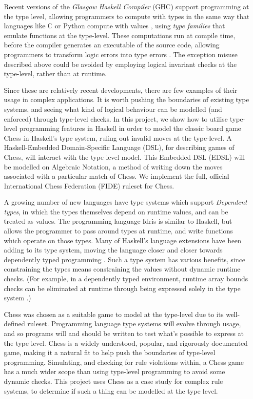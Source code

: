 \documentclass[12pt, a4paper, bibliography=totocnumbered]{scrreprt}
\begin{document}
Recent versions of the \emph{Glasgow Haskell Compiler} (GHC) support programming at the type level, allowing programmers to compute with types in the same way that languages like C or Python compute with values \cite{yorgey2012giving}, using \emph{type families} \cite{opentfs} \cite{closedtfs} that emulate functions at the type-level. These computations run at compile time, before the compiler generates an executable of the source code, allowing programmers to transform logic errors into type errors \cite{twt}. The exception misuse described above could be avoided by employing logical invariant checks at the type-level, rather than at runtime.

Since these are relatively recent developments, there are few examples of their usage in complex applications. It is worth pushing the boundaries of existing type systems, and seeing what kind of logical behaviour can be modelled (and enforced) through type-level checks. In this project, we show how to utilise type-level programming features in Haskell in order to model the classic board game Chess in Haskell's type system, ruling out invalid moves at the type-level. A Haskell-Embedded Domain-Specific Language (DSL), for describing games of Chess, will interact with the type-level model. This Embedded DSL (EDSL) will be modelled on Algebraic Notation, a method of writing down the moves associated with a particular match of Chess. We implement the full, official International Chess Federation (FIDE) ruleset for Chess.

A growing number of new languages have type systems which support \emph{Dependent types}, in which the types themselves depend on runtime values, and can be treated as values. The programming language Idris is similar to Haskell, but allows the programmer to pass around types at runtime, and write functions which operate on those types. Many of Haskell's language extensions have been adding to its type system, moving the language closer and closer towards dependently typed programming \cite{singletons}. Such a type system has various benefits, since constraining the types means constraining the values without dynamic runtime checks. (For example, in a dependently typed environment, runtime array bounds checks can be eliminated at runtime through being expressed solely in the type system \cite{dependentarray}.)

Chess was chosen as a suitable game to model at the type-level due to its well-defined ruleset. Programming language type systems will evolve through usage, and so programs will and should be written to test what's possible to express at the type level. Chess is a widely understood, popular, and rigorously documented game, making it a natural fit to help push the boundaries of type-level programming. Simulating, and checking for rule violations within, a Chess game has a much wider scope than using type-level programming to avoid some dynamic checks. This project uses Chess as a case study for complex rule systems, to determine if such a thing can be modelled at the type level.
\end{document}
